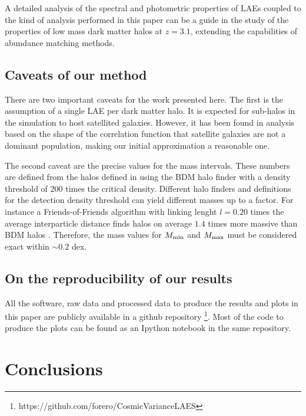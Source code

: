 \documentclass[usenatbib]{mn2e}
\begin{document}
A detailed analysis of the spectral and photometric properties of LAEs
coupled to the kind of analysis performed in this paper can be a guide
in the study of the properties of low mass dark matter halos at
$z=3.1$, extending the capabilities of abundance matching methods.

\subsection{Caveats of our method}

There are two important caveats for the work presented here. The first is the
assumption of a single LAE per dark matter halo. It is expected
for sub-halos in the simulation to host satellited galaxies. However,
it has been found in analysis based on the shape of the correlation
function \citep{Jose2013b} that satellite galaxies are not a dominant
population, making our initial approximation a reasonable one.


The second caveat are the precise values for the mass intervals. These
numbers are defined from the halos defined in using the BDM halo
finder with a density threshold of 200 times the critical
density. Different halo finders and definitions for the detection
density threshold can yield different masses up to a factor. For
instance a Friends-of-Friends algorithm with linking lenght $l=0.20$
times the average interparticle distance finds halos on average $1.4$
times more massive than BDM halos \citep{Bolshoi}. Therefore, the mass
values for $M_{\rm min}$ and $M_{\rm max}$ must be considered exact
within $\sim 0.2$ dex.




\subsection{On the reproducibility of our results}

All the software, raw data and processed data to produce the results
and plots in this paper are publicly available in a github
repository \footnote{https://github.com/forero/CosmicVarianceLAES}. Most
of the code to produce the plots can be found as an Ipython notebook
\citep{IPython} in the same repository.


\section{Conclusions}
\label{sec:conclusions}
\end{document}
